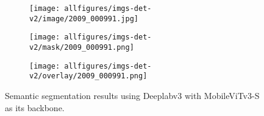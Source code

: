 \documentclass{article} \usepackage{iclr2022_conference,times}
\begin{document}
\begin{figure}[ht]
\begin{subfigure}{.33\textwidth}
  \centering
  \texttt{[image: allfigures/imgs-det-v2/image/2009\_000991.jpg]}
\end{subfigure}\hfil
\begin{subfigure}{.33\textwidth}
  \centering
  \texttt{[image: allfigures/imgs-det-v2/mask/2009\_000991.png]}
\end{subfigure}\hfil
\begin{subfigure}{.33\textwidth}
  \centering
  \texttt{[image: allfigures/imgs-det-v2/overlay/2009\_000991.png]}
\end{subfigure}\hfil
\caption{Semantic segmentation results using Deeplabv3 with MobileViTv3-S as its backbone.}
\label{fig:seg-mv3v1}
\end{figure}
\end{document}
